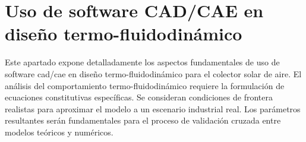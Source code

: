 \section{Uso de software CAD/CAE en diseño termo-fluidodinámico}
\label{sec:cap03_uso_software}

Este apartado expone detalladamente los aspectos fundamentales de uso de software cad/cae en diseño termo-fluidodinámico para el colector solar de aire.
El análisis del comportamiento termo-fluidodinámico requiere la formulación de ecuaciones constitutivas específicas.
Se consideran condiciones de frontera realistas para aproximar el modelo a un escenario industrial real.
Los parámetros resultantes serán fundamentales para el proceso de validación cruzada entre modelos teóricos y numéricos.
